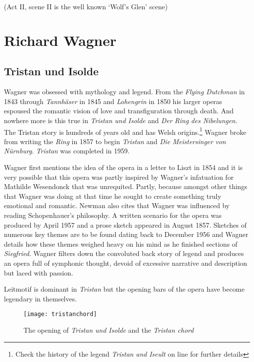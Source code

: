 (Act II, scene II is the well known `Wolf's Glen' scene)

\section{Richard Wagner}

\subsection{Tristan und Isolde} 
Wagner was obsessed with mythology and legend. From the \textit{Flying Dutchman} in 1843 through \textit{Tannh\"aser} in 1845 and \textit{Lohengrin} in 1850 his larger operas espoused the romantic vision of love and transfiguration through death. And nowhere more is this true in \textit{Tristan und Isolde} and \textit{Der Ring des Nibelungen}. The Tristan story is hundreds of years old and has Welsh origins.\footnote{Check the history of the legend \textit{Tristan and Iseult} on line for further details} Wagner broke from writing the \textit{Ring} in 1857 to begin \textit{Tristan} and \textit{Die Meistersinger von N\"urnburg}. \textit{Tristan} was completed in 1959. 

Wagner first mentions the idea of the opera in a letter to Liszt in 1854 and it is very possible that this opera was partly inspired by Wagner's infatuation for Mathilde Wesendonck that was unrequited. Partly, because amongst other things that Wagner was doing at that time he sought to create something truly emotional and romantic. Newman \citeyearpar{newman1977wagner} also cites that Wagner was influenced by reading Schopenhauer's philosophy. A written scenario for the opera was produced by April 1957 and a prose sketch  appeared in August 1857. Sketches of numerous key themes are to be found dating back to December 1956 and Wagner details how these themes weighed heavy on his mind as he finished sections of \textit{Siegfried}. Wagner filters down the convoluted back story of legend and produces an opera full of symphonic thought, devoid of excessive narrative and description but laced with passion. 

Leitmotif is dominant in \textit{Tristan} but the opening bars of the opera have become legendary in themselves.

\begin{figure}[H]
\centering
\texttt{[image: tristanchord]}\caption{The opening of \textit{Tristan und Isolde} and the \textit{Tristan chord}}
\label{fig:tristanchord}
\end{figure}

